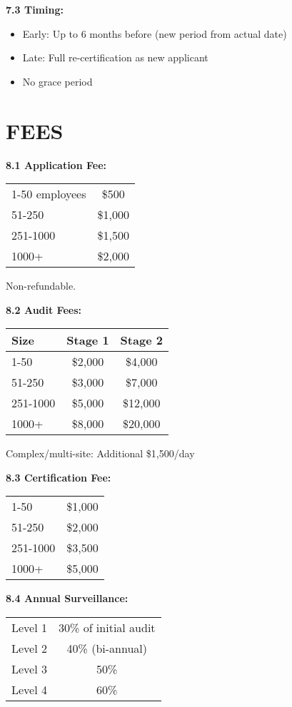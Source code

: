 \documentclass[11pt,a4paper]{article}
\begin{document}
\textbf{7.3 Timing:}
\begin{itemize}
\item Early: Up to 6 months before (new period from actual date)
\item Late: Full re-certification as new applicant
\item No grace period
\end{itemize}

\section{FEES}

\textbf{8.1 Application Fee:}

\begin{tabular}{|l|c|}
\hline
1-50 employees & \$500 \\
51-250 & \$1,000 \\
251-1000 & \$1,500 \\
1000+ & \$2,000 \\
\hline
\end{tabular}

Non-refundable.

\textbf{8.2 Audit Fees:}

\begin{tabular}{|l|c|c|}
\hline
Size & Stage 1 & Stage 2 \\
\hline
1-50 & \$2,000 & \$4,000 \\
51-250 & \$3,000 & \$7,000 \\
251-1000 & \$5,000 & \$12,000 \\
1000+ & \$8,000 & \$20,000 \\
\hline
\end{tabular}

Complex/multi-site: Additional \$1,500/day

\textbf{8.3 Certification Fee:}

\begin{tabular}{|l|c|}
\hline
1-50 & \$1,000 \\
51-250 & \$2,000 \\
251-1000 & \$3,500 \\
1000+ & \$5,000 \\
\hline
\end{tabular}

\textbf{8.4 Annual Surveillance:}

\begin{tabular}{|l|c|}
\hline
Level 1 & 30\% of initial audit \\
Level 2 & 40\% (bi-annual) \\
Level 3 & 50\% \\
Level 4 & 60\% \\
\hline
\end{tabular}
\end{document}
